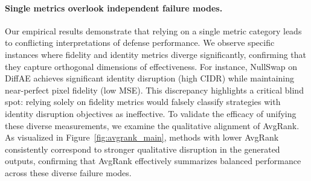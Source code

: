 \documentclass{article}
\begin{document}
\begin{table}[t!]
\begin{subtable}[t]{\columnwidth}
\centering
\caption{LEAT vs. Single-source Latent Attack}
\end{subtable}
\end{table}

\paragraph{Single metrics overlook independent failure modes.}
\label{sec:metric_misalignment}
Our empirical results demonstrate that relying on a single metric category leads to conflicting interpretations of defense performance. We observe specific instances where fidelity and identity metrics diverge significantly, confirming that they capture orthogonal dimensions of effectiveness. For instance, NullSwap on DiffAE achieves significant identity disruption (high CIDR) while maintaining near-perfect pixel fidelity (low MSE). This discrepancy highlights a critical blind spot: relying solely on fidelity metrics would falsely classify strategies with identity disruption objectives as ineffective. To validate the efficacy of unifying these diverse measurements, we examine the qualitative alignment of AvgRank. As visualized in Figure~\ref{fig:avgrank_main}, methods with lower AvgRank consistently correspond to stronger qualitative disruption in the generated outputs, confirming that AvgRank effectively summarizes balanced performance across these diverse failure modes.
\end{document}
